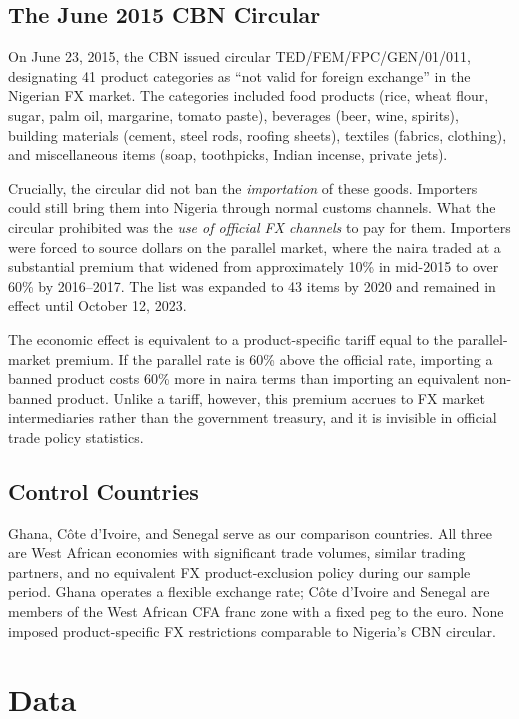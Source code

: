 \documentclass[12pt]{article}
\begin{document}
\subsection{The June 2015 CBN Circular}

On June 23, 2015, the CBN issued circular TED/FEM/FPC/GEN/01/011, designating 41 product categories as ``not valid for foreign exchange'' in the Nigerian FX market. The categories included food products (rice, wheat flour, sugar, palm oil, margarine, tomato paste), beverages (beer, wine, spirits), building materials (cement, steel rods, roofing sheets), textiles (fabrics, clothing), and miscellaneous items (soap, toothpicks, Indian incense, private jets).

Crucially, the circular did not ban the \textit{importation} of these goods. Importers could still bring them into Nigeria through normal customs channels. What the circular prohibited was the \textit{use of official FX channels} to pay for them. Importers were forced to source dollars on the parallel market, where the naira traded at a substantial premium that widened from approximately 10\% in mid-2015 to over 60\% by 2016--2017. The list was expanded to 43 items by 2020 and remained in effect until October 12, 2023.

The economic effect is equivalent to a product-specific tariff equal to the parallel-market premium. If the parallel rate is 60\% above the official rate, importing a banned product costs 60\% more in naira terms than importing an equivalent non-banned product. Unlike a tariff, however, this premium accrues to FX market intermediaries rather than the government treasury, and it is invisible in official trade policy statistics.

\subsection{Control Countries}

Ghana, C\^{o}te d'Ivoire, and Senegal serve as our comparison countries. All three are West African economies with significant trade volumes, similar trading partners, and no equivalent FX product-exclusion policy during our sample period. Ghana operates a flexible exchange rate; C\^{o}te d'Ivoire and Senegal are members of the West African CFA franc zone with a fixed peg to the euro. None imposed product-specific FX restrictions comparable to Nigeria's CBN circular.

\section{Data}
\end{document}
